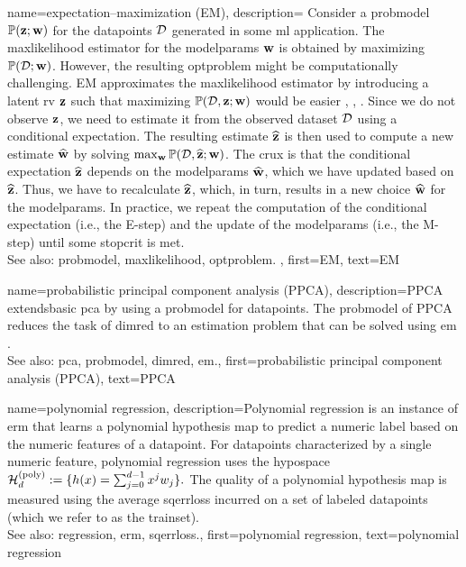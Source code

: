 {name={expectation–maximization (EM)}, 
	description={ 
		Consider a \gls{probmodel} $\mathbb{P}({{\bf z}; {\bf w}})$ for the \glspl{datapoint} $\mathcal{D}$ generated in some 
		\gls{ml} application. The \gls{maxlikelihood} estimator for the \gls{modelparams} ${\bf w}$ is obtained by maximizing 
		$\mathbb{P}({\mathcal{D}; {\bf w}})$. However, the resulting \gls{optproblem} might be computationally 
		challenging. EM approximates the \gls{maxlikelihood} estimator by introducing a latent 
		\gls{rv} ${\bf z}$ such that maximizing $\mathbb{P}({\mathcal{D},{\bf z}; {\bf w}})$ would be easier 
		\cite{hastie01statisticallearning}, \cite{BishopBook}, \cite{GraphModExpFamVarInfWainJor}. Since we 
		do not observe ${\bf z}$, we need to estimate it from the observed \gls{dataset} $\mathcal{D}$ 
		using a conditional \gls{expectation}. The resulting estimate $\widehat{{\bf z}}$ is then used to 
		compute a new estimate $\widehat{{\bf w}}$ by solving $\max_{{\bf w}} \mathbb{P}({\mathcal{D}, \widehat{{\bf z}}; {\bf w}})$. 
		The crux is that the conditional \gls{expectation} $\widehat{{\bf z}}$ depends on the \gls{modelparams} $\widehat{{\bf w}}$, 
		which we have updated based on $\widehat{{\bf z}}$. Thus, we have to recalculate $\widehat{{\bf z}}$, 
		which, in turn, results in a new choice $\widehat{{\bf w}}$ for the \gls{modelparams}. In practice, 
		we repeat the computation of the conditional \gls{expectation} (i.e., the E-step) and the update 
		of the \gls{modelparams} (i.e., the M-step) until some \gls{stopcrit} is met. 
				\\
		See also: \gls{probmodel}, \gls{maxlikelihood}, \gls{optproblem}. },
	first={EM},
	text={EM}
}


{name={probabilistic principal component analysis (PPCA)}, 
	description={PPCA 
		extends\linebreak basic \gls{pca} by using a \gls{probmodel} for \glspl{datapoint}. 
		The \gls{probmodel} of PPCA reduces the task of \gls{dimred} 
		to an estimation problem that can be solved using \gls{em} \cite{TippingProbPCA}.
				\\
		See also: \gls{pca}, \gls{probmodel}, \gls{dimred}, \gls{em}.},
	first={probabilistic principal component analysis (PPCA)},
	text={PPCA}
}
	
{name={polynomial regression}, 
	description={Polynomial 
		\gls{regression} is an instance of \gls{erm} that learns a polynomial \gls{hypothesis} 
		\gls{map} to predict a numeric \gls{label} based on the numeric \glspl{feature} of a \gls{datapoint}. 
		 For \glspl{datapoint} characterized by a single numeric \gls{feature}, polynomial \gls{regression} uses the \gls{hypospace} 
		$\mathcal{H}^{(\rm poly)}_{d} := \{ h(x) = \sum_{j=0}^{d-1} x^{j} w_{j} \}.$
		The quality of a polynomial \gls{hypothesis} \gls{map} is measured using the average \gls{sqerrloss} 
		incurred on a set of \glspl{labeled datapoint} (which we refer to as the \gls{trainset}).
					\\
		See also: \gls{regression}, \gls{erm}, \gls{sqerrloss}.},
	first={polynomial regression},
	text={polynomial regression}
}

